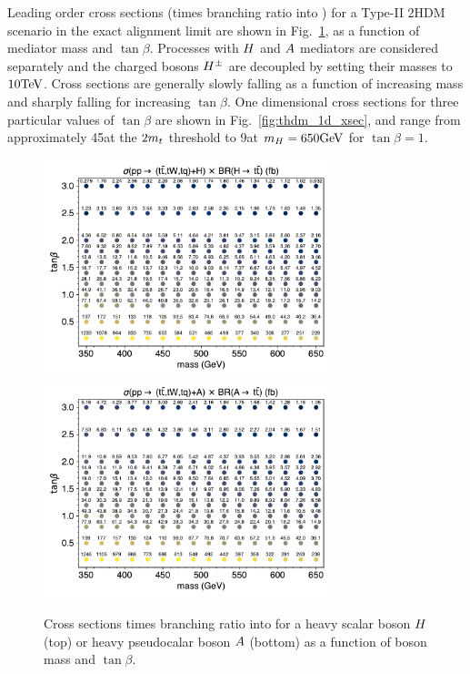 Leading order cross sections (times branching ratio into \ttbar) for a Type-II 2HDM scenario in the exact alignment limit 
are shown in Fig.~\ref{fig:thdm_2d_xsecs}, as a function of mediator mass and $\tan\beta$.
Processes with $H$ and $A$ mediators
are considered separately and the charged bosons $H^\pm$ are decoupled by setting their
masses to $10\text{TeV}$. Cross sections are generally slowly falling as a function of increasing mass
and sharply falling for increasing $\tan\beta$. One dimensional cross sections
for three particular values of $\tan\beta$ are shown in Fig.~\ref{fig:thdm_1d_xsec},
and range from approximately 45\ifb at the $2m_t$ threshold to 9\ifb at $m_H=650\text{GeV}$
for $\tan\beta=1$.

\begin{figure}[htb!]
    \centering
    \includegraphics[width=0.75\textwidth]{figs/ftan/plot_2d_2hdm_xsec_h} \\
    \includegraphics[width=0.75\textwidth]{figs/ftan/plot_2d_2hdm_xsec_a}
\caption{Cross sections times branching ratio into \ttbar for a heavy scalar boson $H$ (top) 
or heavy pseudocalar boson $A$ (bottom) as a function of boson mass and $\tan\beta$.}
\label{fig:thdm_2d_xsecs}
\end{figure}

